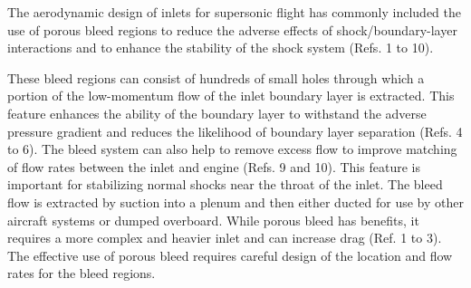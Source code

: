 The aerodynamic design of inlets for supersonic flight has commonly included the use of porous bleed regions to reduce the adverse effects of shock/boundary-layer interactions and to enhance the stability of the shock system (Refs. 1 to 10).











 These bleed regions can consist of hundreds of small holes through which a portion of the low-momentum flow of the inlet boundary layer is extracted. This feature enhances the ability of the boundary layer to withstand the adverse pressure gradient and reduces the likelihood of boundary layer separation (Refs. 4 to 6). The bleed system can also help to remove excess flow to improve matching of flow rates between the inlet and engine (Refs. 9 and 10). This feature is important for stabilizing normal shocks near the throat of the inlet. The bleed flow is extracted by suction into a plenum and then either ducted for use by other aircraft systems or dumped overboard. While porous bleed has benefits, it requires a more complex and heavier inlet and can increase drag (Ref. 1 to 3). The effective use of porous bleed requires careful design of the location and flow rates for the bleed regions.

